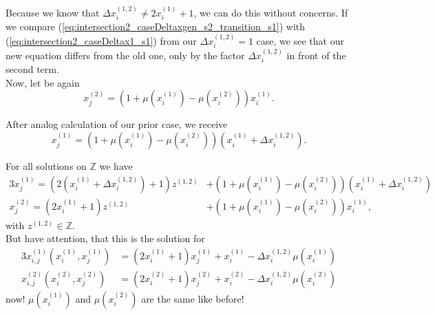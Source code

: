 Because we know that $\Delta x_{i}^{\left(1,2\right)} \neq 2x_{i}^{\left(1\right)} + 1$, we can do this without concerns. If we compare (\ref{eq:intersection2_caseDeltaxgen_s2_transition_s1}) with (\ref{eq:intersection2_caseDeltax1_s1}) from our $\Delta x_{i}^{\left(1,2\right)} = 1$ case, we see that our new equation differs from the old one, only by the factor $\Delta x_{i}^{\left(1,2\right)}$ in front of the second term.\\

Now, let be again
\begin{equation}
	x_{j}^{\left(2\right)} = \left(1 + \mu\left(x_{i}^{\left(1\right)}\right) - \mu\left(x_{i}^{\left(2\right)}\right)\right)x_{i}^{\left(1\right)}.
\label{eq:solxj2deltagen}
\end{equation}

After analog calculation of our prior case, we receive
\begin{equation}
	x_{j}^{\left(1\right)} = \left(1 + \mu\left(x_{i}^{\left(1\right)}\right) - \mu\left(x_{i}^{\left(2\right)}\right)\right)\left(x_{i}^{\left(1\right)} + \Delta x_{i}^{\left(1,2\right)}\right).
\label{eq:solxj1deltagen}
\end{equation}

For all solutions on $\mathbb{Z}$ we have
\begin{alignat}{3}
	x_{j}^{\left(1\right)} = \left(2\left(x_{i}^{\left(1\right)} + \Delta x_{i}^{\left(1,2\right)}\right) + 1\right)z^{\left(1,2\right)} &+ \left(1 + \mu\left(x_{i}^{\left(1\right)}\right) - \mu\left(x_{i}^{\left(2\right)}\right)\right)\left(x_{i}^{\left(1\right)} + \Delta x_{i}^{\left(1,2\right)}\right) \label{eq:solxj1deltagen_all} \\
	x_{j}^{\left(2\right)} = \left(2x_{i}^{\left(1\right)} + 1\right)z^{\left(1,2\right)} &+ \left(1 + \mu\left(x_{i}^{\left(1\right)}\right) - \mu\left(x_{i}^{\left(2\right)}\right)\right)x_{i}^{\left(1\right)} \label{eq:solxj2deltagen_all},
\end{alignat}
with $z^{\left(1,2\right)} \in \mathbb{Z}$.\\

But have attention, that this is the solution for 
\begin{alignat}{3}
	x_{i,j}^{\left(1\right)}\left(x_{i}^{\left(1\right)}, x_{j}^{\left(1\right)}\right) &= \left(2x_{i}^{\left(1\right)} + 1\right)x_{j}^{\left(1\right)} + x_{i}^{\left(1\right)} - \Delta x_{i}^{\left(1,2\right)}\mu\left(x_{i}^{\left(1\right)}\right) \label{eq:xijeq_new1} \\
	x_{i,j}^{\left(2\right)}\left(x_{i}^{\left(2\right)}, x_{j}^{\left(2\right)}\right) &= \left(2x_{i}^{\left(2\right)} + 1\right)x_{j}^{\left(2\right)} + x_{i}^{\left(2\right)} - \Delta x_{i}^{\left(1,2\right)}\mu\left(x_{i}^{\left(2\right)}\right) \label{eq:xijeq_new2}
\end{alignat}
now! $\mu\left(x_{i}^{\left(1\right)}\right)$ and $\mu\left(x_{i}^{\left(2\right)}\right)$ are the same like before!
